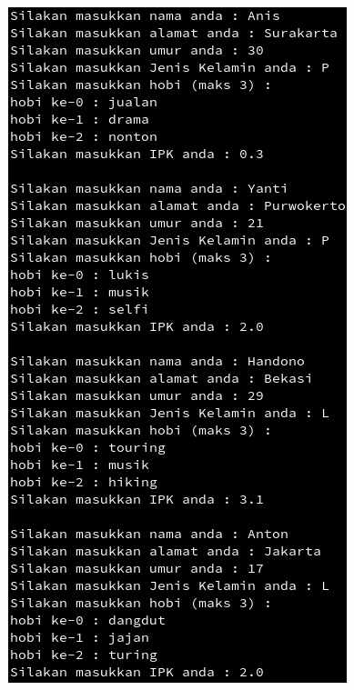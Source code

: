 \documentclass[a4paper,12pt]{article}
\begin{document}
\begin{center}
    \includegraphics[scale=.7]{lat2.png} 

\end{center}
\end{document}
